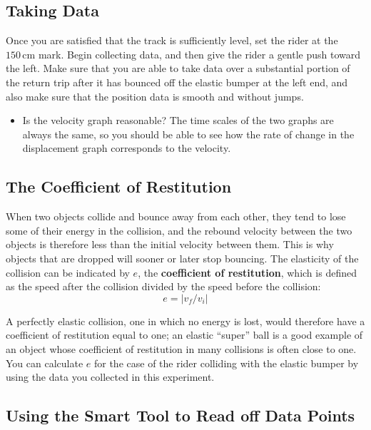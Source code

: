 \subsection{Taking Data}

Once you are satisfied that the track is sufficiently level, set the rider at the $150\,\mathrm{cm}$ mark.  Begin collecting data, and then give the rider a gentle push toward the left.  Make sure that you are able to take data over a substantial portion of the return trip after it has bounced off the elastic bumper at the left end, and also make sure that the position data is smooth and without jumps.

\begin{itemize}
    \item Is the velocity graph reasonable?  The time scales of the two graphs are always the same, so you should be able to see how the rate of change in the displacement graph corresponds to the velocity.
\end{itemize}

\subsection{The Coefficient of Restitution}

When two objects collide and bounce away from each other, they tend to lose some of their energy in the collision, and the rebound velocity between the two objects is therefore less than the initial velocity between them.  This is why objects that are dropped will sooner or later stop bouncing.  The elasticity of the collision can be indicated by $e$, the \textbf{coefficient of restitution}, which is defined as the speed after the collision divided by the speed before the collision:
\begin{equation}
    e = \left|v_f/v_i\right|
\end{equation}

A perfectly elastic collision, one in which no energy is lost, would therefore have a coefficient of restitution equal to one; an elastic ``super'' ball is a good example of an object whose coefficient of restitution in many collisions is often close to one.  You can calculate $e$ for the case of the rider colliding with the elastic bumper by using the data you collected in this experiment.

\subsection{Using the Smart Tool to Read off Data Points}

